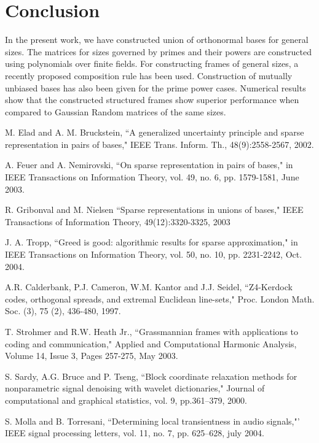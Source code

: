 \documentclass{IEEEtran}
\begin{document}
\section{Conclusion}
\label{sec:conclusions}
In the present work, we have constructed union of orthonormal bases for general sizes.  The matrices for
sizes governed by primes and their powers are constructed using polynomials over finite fields. For
constructing frames of general sizes, a recently proposed composition rule has been used. Construction of
mutually unbiased bases has also been given for the prime power cases. Numerical
results show that the constructed structured
frames show superior performance when compared to Gaussian Random matrices
of the same sizes.

\begin{thebibliography}{99}

M. Elad and A. M. Bruckstein, ``A generalized uncertainty principle and sparse representation in pairs of bases," IEEE Trans. Inform. Th., 48(9):2558-2567, 2002.

A. Feuer and A. Nemirovski, ``On sparse representation in pairs of bases," in IEEE Transactions on Information Theory, vol. 49, no. 6, pp. 1579-1581, June 2003.

  R. Gribonval and M. Nielsen ``Sparse representations in unions of bases," IEEE Transactions of Information
  Theory, 49(12):3320-3325, 2003

J. A. Tropp, ``Greed is good: algorithmic results for sparse approximation," in IEEE Transactions on Information Theory, vol. 50, no. 10, pp. 2231-2242, Oct. 2004.

A.R. Calderbank, P.J. Cameron, W.M. Kantor and J.J. Seidel, ``Z4-Kerdock codes, orthogonal spreads, and extremal Euclidean line-sets,"
Proc. London Math. Soc. (3), 75 (2), 436-480, 1997.

T. Strohmer and R.W. Heath Jr., ``Grassmannian frames with applications to coding and communication," Applied and Computational Harmonic Analysis, Volume 14, Issue 3, Pages 257-275,  May 2003.

S. Sardy, A.G. Bruce and P. Tseng, ``Block coordinate relaxation methods for nonparametric signal denoising with wavelet dictionaries,"
Journal of computational and graphical statistics, vol. 9, pp.361–379, 2000.

S. Molla and B. Torresani, ``Determining local transientness in audio signals,"' IEEE signal processing letters, vol. 11, no. 7, pp. 625–628,
july 2004.


\end{thebibliography}
\end{document}
